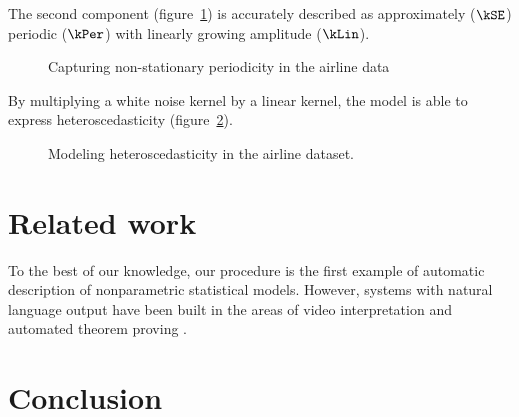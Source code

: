 The second component (figure~\ref{fig:lin_periodic}) is accurately described as approximately ($\kSE$) periodic ($\kPer$) with linearly growing amplitude ($\kLin$).
%
\begin{figure}[h]
\centering
{}
\caption[Capturing non-stationary periodicity in the airline data]
{Capturing non-stationary periodicity in the airline data}
\label{fig:lin_periodic}
\end{figure}
%
By multiplying a white noise kernel by a linear kernel, the model is able to express heteroscedasticity (figure~\ref{fig:heteroscedastic}).
%
\begin{figure}[h]
\centering
{}
\caption[Modeling heteroscedasticity in the airline dataset]
{Modeling heteroscedasticity in the airline dataset.}
\label{fig:heteroscedastic}
\end{figure}






\section{Related work}
\label{sec:related-work}


To the best of our knowledge, our procedure is the first example of automatic description of nonparametric statistical models.
However, systems with natural language output have been built in the areas of video interpretation \citep{barbu2012video} and automated theorem proving \citep{GanesalingamG13}.




\section{Conclusion}

